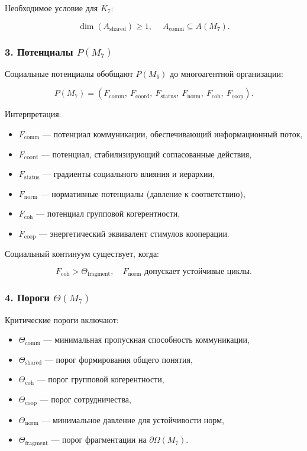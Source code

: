 Необходимое условие для $K_7$:

\[
\dim(A_{\mathrm{shared}})\ge 1,\
\quad
A_{\mathrm{comm}}\subseteq A(M_7).
\]

\subsubsection*{3. Потенциалы \texorpdfstring{$P(M_7)$}{P(M_7)}}

Социальные потенциалы обобщают $P(M_6)$ до многоагентной организации:

\[
P(M_7)=
(F_{\mathrm{comm}},\
F_{\mathrm{coord}},\
F_{\mathrm{status}},\
F_{\mathrm{norm}},\
F_{\mathrm{coh}},\
F_{\mathrm{coop}}).
\]

Интерпретация:

\begin{itemize}
    \item $F_{\mathrm{comm}}$ — потенциал коммуникации, обеспечивающий информационный поток,
    \item $F_{\mathrm{coord}}$ — потенциал, стабилизирующий согласованные действия,
    \item $F_{\mathrm{status}}$ — градиенты социального влияния и иерархии,
    \item $F_{\mathrm{norm}}$ — нормативные потенциалы (давление к соответствию),
    \item $F_{\mathrm{coh}}$ — потенциал групповой когерентности,
    \item $F_{\mathrm{coop}}$ — энергетический эквивалент стимулов кооперации.
\end{itemize}

Социальный континуум существует, когда:

\[
F_{\mathrm{coh}} > \Theta_{\mathrm{fragment}},
\quad F_{\mathrm{norm}} \text{ допускает устойчивые циклы}.
\]

\subsubsection*{4. Пороги \texorpdfstring{$\Theta(M_7)$}{\Theta(M_7)}}

Критические пороги включают:

\begin{itemize}
    \item $\Theta_{\mathrm{comm}}$ — минимальная пропускная способность коммуникации,
    \item $\Theta_{\mathrm{shared}}$ — порог формирования общего понятия,
    \item $\Theta_{\mathrm{coh}}$ — порог групповой когерентности,
    \item $\Theta_{\mathrm{coop}}$ — порог сотрудничества,
    \item $\Theta_{\mathrm{norm}}$ — минимальное давление для устойчивости норм,
    \item $\Theta_{\mathrm{fragment}}$ — порог фрагментации на $\partial\Omega(M_7)$.
\end{itemize}

